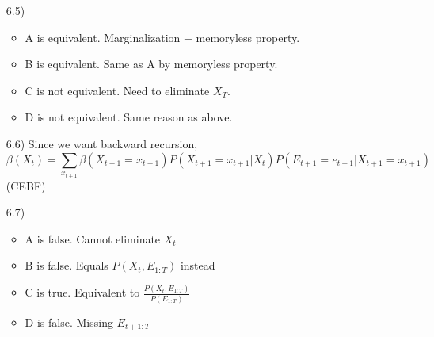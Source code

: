 \documentclass[11pt]{article}
\theoremstyle{definition}
\theoremstyle{remark}
\begin{document}
\begin{enumerate}
\item[6.5)]
\begin{itemize}
\item A is equivalent. Marginalization + memoryless property.
\item B is equivalent. Same as A by memoryless property.
\item C is not equivalent. Need to eliminate $X_T$.
\item D is not equivalent. Same reason as above.
\end{itemize}

\item[6.6)] Since we want backward recursion,
\[
\beta(X_t) = \sum_{x_{t+1}} \beta (X_{t+1} = x_{t+1})P(X_{t+1} = x_{t+1} | X_t)P(E_{t+1} = e_{t+1} | X_{t+1} = x_{t+1})
\]
(CEBF)

\item[6.7)]
\begin{itemize}
\item A is false. Cannot eliminate $X_t$
\item B is false. Equals $P(X_t, E_{1:T})$ instead
\item C is true. Equivalent to $\frac{P(X_t, E_{1:T})}{P(E_{1:T})}$
\item D is false. Missing $E_{t+1:T}$
\end{itemize}
\end{enumerate}
\end{document}
